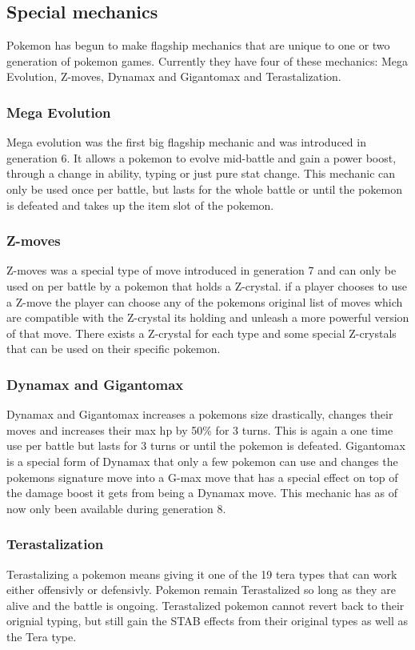 \subsection{Special mechanics}
Pokemon has begun to make flagship mechanics that are unique to one or two generation of pokemon games.
Currently they have four of these mechanics: Mega Evolution, Z-moves, Dynamax and Gigantomax and Terastalization.
\subsubsection{Mega Evolution}
Mega evolution was the first big flagship mechanic and was introduced in generation 6. It allows a pokemon to evolve mid-battle and gain a 
power boost, through a change in ability, typing or just pure stat change. This mechanic can only be used once per battle, but lasts for the whole battle
or until the pokemon is defeated and takes up the item slot of the pokemon.\cite{MegaEvolution}
\subsubsection{Z-moves}
Z-moves was a special type of move introduced in generation 7 and can only be used on per battle by a pokemon that holds a Z-crystal. if a player chooses to 
use a Z-move the player can choose any of the pokemons original list of moves which are compatible with the Z-crystal its holding and unleash a more powerful
version of that move. There exists a Z-crystal for each type and some special Z-crystals that can be used on their specific pokemon. \cite{Zmoves}
\subsubsection{Dynamax and Gigantomax}
Dynamax and Gigantomax increases a pokemons size drastically, changes their moves and increases their max hp by 50\% for 3 turns. This is again a one time
use per battle but lasts for 3 turns or until the pokemon is defeated. Gigantomax is a special form of Dynamax that only a few pokemon can use and 
changes the pokemons signature move into a G-max move that has a special effect on top of the damage boost it gets from being a Dynamax move.
This mechanic has as of now only been available during generation 8. \cite{Dynamax}
\subsubsection{Terastalization}
Terastalizing a pokemon means giving it one of the 19 tera types that can work either offensivly or defensivly. Pokemon remain Terastalized so long 
as they are alive and the battle is ongoing. Terastalized pokemon cannot revert back to their orignial typing, but still gain the STAB effects 
from their original types as well as the Tera type. \cite{TeraType}

